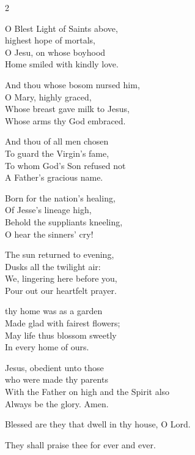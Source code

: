 \documentclass[12pt]{book}
\begin{document}
\begin{multicols}{2}
\begin{enpars}
O Blest Light of Saints above,\\
highest hope of mortals,\\
O Jesu, on whose boyhood\\
Home smiled with kindly love.

And thou whose bosom nursed him,\\
O Mary, highly graced,\\
Whose breast gave milk to Jesus,\\
Whose arms thy God embraced.

And thou of all men chosen\\
To guard the Virgin’s fame,\\
To whom God’s Son refused not\\
A Father’s gracious name.

Born for the nation’s healing,\\
Of Jesse’s lineage high,\\
Behold the suppliants kneeling,\\
O hear the sinners’ cry!

The sun returned to evening,\\
Dusks all the twilight air:\\
We, lingering here before you,\\
Pour out our heartfelt prayer.

thy home was as a garden\\
Made glad with fairest flowers;\\
May life thus blossom sweetly\\
In every home of ours.

Jesus, obedient unto those\\
who were made thy parents\\
With the Father on high and the Spirit also\\
Always be the glory.
Amen.

\end{enpars}
\end{multicols}



\begin{enpars} \noindent \vv Blessed are they that dwell in thy house, O Lord.

\noindent \rr They shall praise thee for ever and ever.

 \end{enpars}
\end{document}
